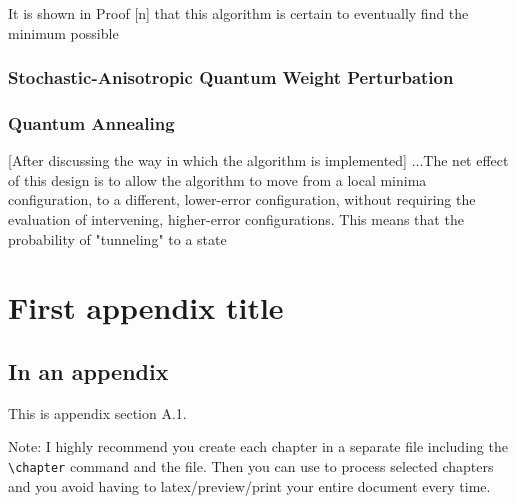 \documentclass[11pt]{afthesis}
\begin{document}
It is shown in Proof [n] that this algorithm is certain to eventually find the minimum possible


\subsection{Stochastic-Anisotropic Quantum Weight Perturbation}



\subsection{Quantum Annealing}


[After discussing the way in which the algorithm is implemented] ...The net effect of this design is to allow the algorithm to move from a local minima configuration, to a different, lower-error configuration, without requiring the evaluation of intervening, higher-error configurations. This means that the probability of "tunneling" to a state


\appendix		%

\chapter{First appendix title}

\section{In an appendix} 

This is appendix section A.1.

Note: I highly recommend you create each chapter in a separate file
including the \verb|\chapter| command and \verb|| the file.
Then you can use \verb|| to process selected chapters and
you avoid having to latex/preview/print your entire document every
time.

\end{document}
